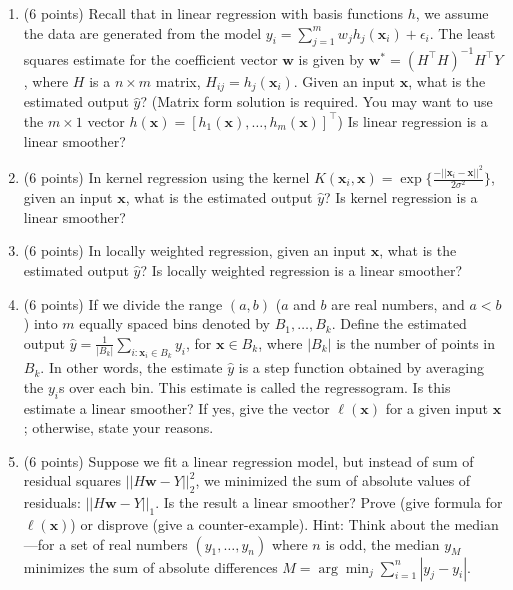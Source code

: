 \documentclass[english]{article}
\newcommand{\bx}{\mathbf{x}}
\newcommand{\bw}{\mathbf{w}}
\begin{document}
\begin{enumerate}
\item (6 points) Recall that in linear regression with basis functions
  $h$, we assume the data are generated from the model
  $y_i=\sum_{j=1}^m w_j h_j(\bx_i)+\epsilon_i$. The least squares
  estimate for the coefficient vector $\bw$ is given by $\bw^*=(H^\top
  H)^{-1}H^\top Y$, where $H$ is a $n\times m$ matrix,
  $H_{ij}=h_j(\bx_i)$. Given an input $\bx$, what is the estimated
  output $\hat{y}$? (Matrix form solution is required. You may want to
  use the $m\times 1$ vector $h(\bx)=[h_1(\bx),\ldots,h_m(\bx)]^\top$)
  Is linear regression is a linear smoother?

\item (6 points) In kernel regression using the kernel $K(\bx_i,\bx)=
  \exp\{\frac{-||\bx_i-\bx||^2}{2\sigma^2}\}$, given an input $\bx$,
  what is the estimated output $\hat{y}$?  Is kernel regression is a
  linear smoother?

\item (6 points) In locally weighted regression, given an input $\bx$,
  what is the estimated output $\hat{y}$?  Is locally weighted
  regression is a linear smoother?

\item (6 points) If we divide the range $(a,b)$ ($a$ and $b$ are real
  numbers, and $a<b$) into $m$ equally spaced bins denoted by
  $B_1,\ldots,B_k$.  Define the estimated output
  $\hat{y}=\frac{1}{|B_k|}\sum_{i:\bx_i\in B_k}y_i$, for $\bx\in B_k$,
  where $|B_k|$ is the number of points in $B_k$. In other words, the
  estimate $\hat{y}$ is a step function obtained by averaging the
  $y_i$s over each bin. This estimate is called the regressogram. Is
  this estimate a linear smoother? If yes, give the vector $\ell(\bx)$
  for a given input $\bx$; otherwise, state your reasons.


\item (6 points) Suppose we fit a linear regression model, but instead
  of sum of residual squares $||H\bw-Y||_2^2$, we minimized the sum of
  absolute values of residuals: $||H\bw-Y||_1$. Is the result a linear
  smoother?  Prove (give formula for $\ell(\bx)$) or disprove (give a
  counter-example).  Hint: Think about the median---for a set of real
  numbers $(y_1,\ldots,y_n)$ where $n$ is odd, the median $y_M$
  minimizes the sum of absolute differences $M = \arg\min_j
  \sum_{i=1}^n |y_j - y_i|$.
  
  

\end{enumerate}
  
\end{document}
